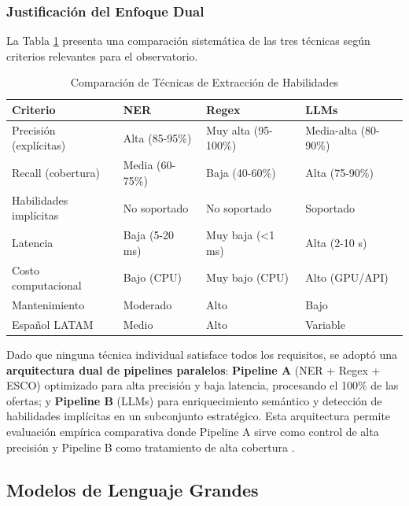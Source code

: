 \subsubsection{Justificación del Enfoque Dual}

La Tabla \ref{tab:comparacion-tecnicas-extraccion} presenta una comparación sistemática de las tres técnicas según criterios relevantes para el observatorio.

\begin{table}[H]
\centering
\caption{Comparación de Técnicas de Extracción de Habilidades}
\label{tab:comparacion-tecnicas-extraccion}
\begin{tabular}{|p{3cm}|p{3.5cm}|p{3.5cm}|p{3.5cm}|}
\hline
\textbf{Criterio} & \textbf{NER} & \textbf{Regex} & \textbf{LLMs} \\
\hline
Precisión (explícitas) & Alta (85-95\%) & Muy alta (95-100\%) & Media-alta (80-90\%) \\
\hline
Recall (cobertura) & Media (60-75\%) & Baja (40-60\%) & Alta (75-90\%) \\
\hline
Habilidades implícitas & No soportado & No soportado & Soportado \\
\hline
Latencia & Baja (5-20 ms) & Muy baja (<1 ms) & Alta (2-10 s) \\
\hline
Costo computacional & Bajo (CPU) & Muy bajo (CPU) & Alto (GPU/API) \\
\hline
Mantenimiento & Moderado & Alto & Bajo \\
\hline
Español LATAM & Medio & Alto & Variable \\
\hline
\end{tabular}
\end{table}

Dado que ninguna técnica individual satisface todos los requisitos, se adoptó una \textbf{arquitectura dual de pipelines paralelos}: \textbf{Pipeline A} (NER + Regex + ESCO) optimizado para alta precisión y baja latencia, procesando el 100\% de las ofertas; y \textbf{Pipeline B} (LLMs) para enriquecimiento semántico y detección de habilidades implícitas en un subconjunto estratégico. Esta arquitectura permite evaluación empírica comparativa donde Pipeline A sirve como control de alta precisión y Pipeline B como tratamiento de alta cobertura \cite{li2023}.

\subsection{Modelos de Lenguaje Grandes}

